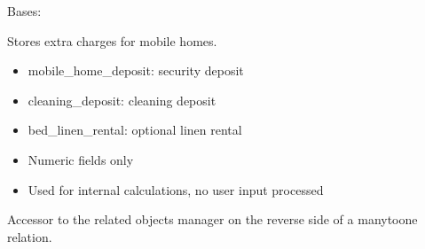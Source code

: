 \documentclass[letterpaper,10pt,english]{sphinxmanual}
\begin{document}

\begin{fulllineitems}
\label{\detokenize{index:bookings.models.SupplementMobileHome}}
\pysigstartsignatures
\pysiglinewithargsret
{}
{\sphinxparamcomma {}}
{}
\pysigstopsignatures
\sphinxAtStartPar
Bases: 

\sphinxAtStartPar
Stores extra charges for mobile homes.
\begin{description}
\begin{itemize}
\item {} 
\sphinxAtStartPar
mobile\_home\_deposit: security deposit

\item {} 
\sphinxAtStartPar
cleaning\_deposit: cleaning deposit

\item {} 
\sphinxAtStartPar
bed\_linen\_rental: optional linen rental

\end{itemize}

\begin{itemize}
\item {} 
\sphinxAtStartPar
Numeric fields only

\item {} 
\sphinxAtStartPar
Used for internal calculations, no user input processed

\end{itemize}

\end{description}

\begin{fulllineitems}
\label{\detokenize{index:bookings.models.SupplementMobileHome.translations}}
\pysigstartsignatures
\pysigline
{}
\pysigstopsignatures
\sphinxAtStartPar
Accessor to the related objects manager on the reverse side of a
many\sphinxhyphen{}to\sphinxhyphen{}one relation.


\end{fulllineitems}
\end{fulllineitems}
\end{document}

